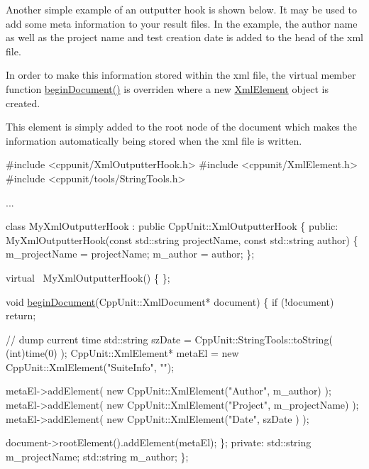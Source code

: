 Another simple example of an outputter hook is shown below. It may be used to add some meta information to your result files. In the example, the author name as well as the project name and test creation date is added to the head of the xml file.

In order to make this information stored within the xml file, the virtual member function \hyperlink{class_xml_outputter_hook_a35d3cc333991efbf9a6365fefc93ed46}{begin\+Document()} is overriden where a new \hyperlink{class_xml_element}{Xml\+Element} object is created.

This element is simply added to the root node of the document which makes the information automatically being stored when the xml file is written.


\begin{DoxyCode}
\textcolor{preprocessor}{#include <cppunit/XmlOutputterHook.h>}
\textcolor{preprocessor}{#include <cppunit/XmlElement.h>}
\textcolor{preprocessor}{#include <cppunit/tools/StringTools.h>}

...

class MyXmlOutputterHook : \textcolor{keyword}{public} CppUnit::XmlOutputterHook
\{
\textcolor{keyword}{public}:
  MyXmlOutputterHook(\textcolor{keyword}{const} std::string projectName,
                     \textcolor{keyword}{const} std::string author)
  \{
     m\_projectName = projectName;
     m\_author      = author;
  \};

  \textcolor{keyword}{virtual} ~MyXmlOutputterHook()
  \{
  \};

  \textcolor{keywordtype}{void} \hyperlink{class_xml_outputter_hook_a35d3cc333991efbf9a6365fefc93ed46}{beginDocument}(CppUnit::XmlDocument* document)
  \{
    \textcolor{keywordflow}{if} (!document)
      \textcolor{keywordflow}{return};

    \textcolor{comment}{// dump current time}
    std::string szDate          = CppUnit::StringTools::toString( (\textcolor{keywordtype}{int})time(0) );
    CppUnit::XmlElement* metaEl = \textcolor{keyword}{new} CppUnit::XmlElement(\textcolor{stringliteral}{"SuiteInfo"}, 
                                                          \textcolor{stringliteral}{""});

    metaEl->addElement( \textcolor{keyword}{new} CppUnit::XmlElement(\textcolor{stringliteral}{"Author"}, m\_author) );
    metaEl->addElement( \textcolor{keyword}{new} CppUnit::XmlElement(\textcolor{stringliteral}{"Project"}, m\_projectName) );
    metaEl->addElement( \textcolor{keyword}{new} CppUnit::XmlElement(\textcolor{stringliteral}{"Date"}, szDate ) );
   
    document->rootElement().addElement(metaEl);
  \};
\textcolor{keyword}{private}:
  std::string m\_projectName;
  std::string m\_author;
\}; 
\end{DoxyCode}


